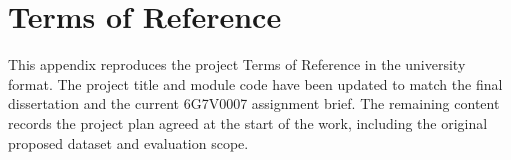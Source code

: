 \chapter{Terms of Reference}
\label{app:terms_of_reference}

This appendix reproduces the project Terms of Reference in the university format. The project title and module code have been updated to match the final dissertation and the current 6G7V0007 assignment brief. The remaining content records the project plan agreed at the start of the work, including the original proposed dataset and evaluation scope.


